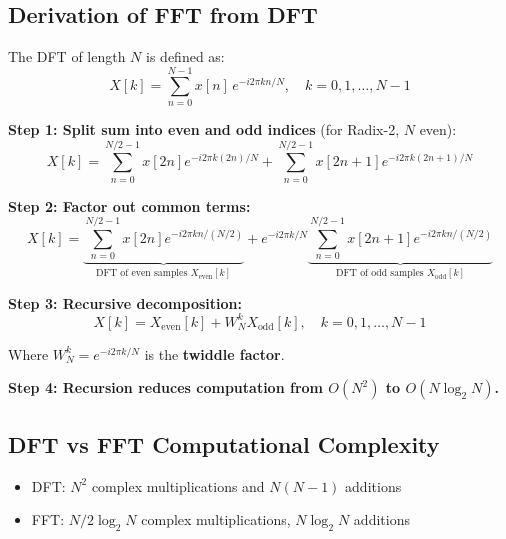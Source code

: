 \documentclass[a4paper,12pt]{article}
\begin{document}
\subsection{Derivation of FFT from DFT}

The DFT of length $N$ is defined as:
\[
X[k] = \sum_{n=0}^{N-1} x[n] \, e^{-i 2\pi k n / N}, \quad k = 0,1,\dots,N-1
\]

\textbf{Step 1: Split sum into even and odd indices} (for Radix-2, $N$ even):
\[
X[k] = \sum_{n=0}^{N/2-1} x[2n] e^{-i 2\pi k (2n)/N} + \sum_{n=0}^{N/2-1} x[2n+1] e^{-i 2\pi k (2n+1)/N}
\]

\textbf{Step 2: Factor out common terms:}
\[
X[k] = \underbrace{\sum_{n=0}^{N/2-1} x[2n] e^{-i 2\pi k n/(N/2)}}_{\text{DFT of even samples } X_\text{even}[k]} + 
e^{-i 2\pi k / N} \underbrace{\sum_{n=0}^{N/2-1} x[2n+1] e^{-i 2\pi k n/(N/2)}}_{\text{DFT of odd samples } X_\text{odd}[k]}
\]

\textbf{Step 3: Recursive decomposition:}  
\[
X[k] = X_\text{even}[k] + W_N^k X_\text{odd}[k], \quad k = 0,1,\dots,N-1
\]

Where $W_N^k = e^{-i 2\pi k / N}$ is the \textbf{twiddle factor}.  

\textbf{Step 4: Recursion reduces computation from $O(N^2)$ to $O(N\log_2 N)$.}


\subsection{DFT vs FFT\: Computational Complexity}

\begin{itemize}
    \item DFT: $N^2$ complex multiplications and $N(N-1)$ additions
    \item FFT: $N/2 \log_2 N$ complex multiplications, $N \log_2 N$ additions
\end{itemize}

\begin{center}
\end{center}
\end{document}
